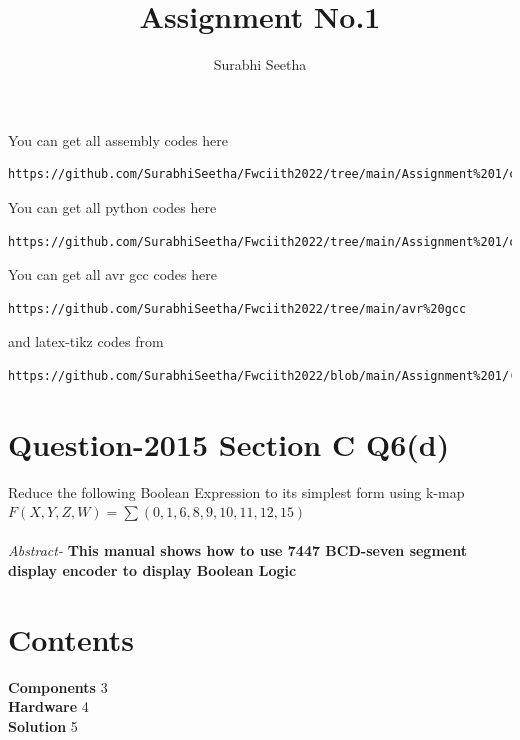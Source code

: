 \documentclass[journal,12pt,twocolumn]{IEEEtran}
\begin{document}
\title{Assignment No.1}

\author{Surabhi Seetha}
\maketitle
\newpage
\bigskip
\renewcommand{\thefigure}{\theenumi}
\renewcommand{\thetable}{\theenumi}

You can get all assembly codes here
\begin{lstlisting}
https://github.com/SurabhiSeetha/Fwciith2022/tree/main/Assignment%201/codes/asm
\end{lstlisting}
You can get all python codes here
\begin{lstlisting}
https://github.com/SurabhiSeetha/Fwciith2022/tree/main/Assignment%201/codes/src
\end{lstlisting}
You can get all avr gcc codes here
\begin{lstlisting}
https://github.com/SurabhiSeetha/Fwciith2022/tree/main/avr%20gcc

\end{lstlisting}
and latex-tikz codes from 
%
\begin{lstlisting}
https://github.com/SurabhiSeetha/Fwciith2022/blob/main/Assignment%201/(Latex).tex
\end{lstlisting}
%
\section{Question-2015 Section C Q6(d)}

Reduce the following Boolean Expression to its simplest form using k-map
$F(X,Y,Z,W)= \sum (0,1,6,8,9,10,11,12,15)$ \\
\\
\textit{Abstract-}
\textbf{This manual shows how to use 7447 BCD-seven segment display encoder to display Boolean Logic}
\section{Contents}
\raggedright
\textbf{Components}
\hspace{10em} 3
\\\textbf{Hardware}
\hspace{11em} 4
\\\textbf{Solution}
\hspace{11.8em}   5\\
\end{document}
